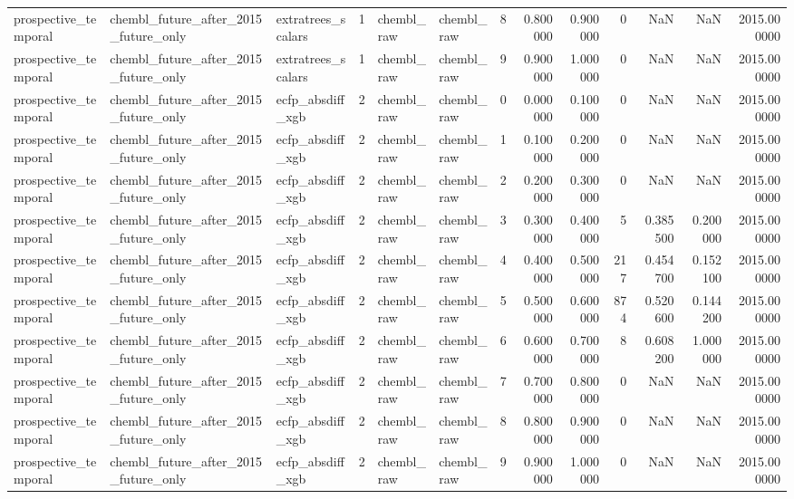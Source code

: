 \begin{longtable}{lllrllrrrrrrr}
prospective\_temporal & chembl\_future\_after\_2015\_future\_only & extratrees\_scalars & 1 & chembl\_raw & chembl\_raw & 8 & 0.800000 & 0.900000 & 0 & NaN & NaN & 2015.000000 \\
prospective\_temporal & chembl\_future\_after\_2015\_future\_only & extratrees\_scalars & 1 & chembl\_raw & chembl\_raw & 9 & 0.900000 & 1.000000 & 0 & NaN & NaN & 2015.000000 \\
prospective\_temporal & chembl\_future\_after\_2015\_future\_only & ecfp\_absdiff\_xgb & 2 & chembl\_raw & chembl\_raw & 0 & 0.000000 & 0.100000 & 0 & NaN & NaN & 2015.000000 \\
prospective\_temporal & chembl\_future\_after\_2015\_future\_only & ecfp\_absdiff\_xgb & 2 & chembl\_raw & chembl\_raw & 1 & 0.100000 & 0.200000 & 0 & NaN & NaN & 2015.000000 \\
prospective\_temporal & chembl\_future\_after\_2015\_future\_only & ecfp\_absdiff\_xgb & 2 & chembl\_raw & chembl\_raw & 2 & 0.200000 & 0.300000 & 0 & NaN & NaN & 2015.000000 \\
prospective\_temporal & chembl\_future\_after\_2015\_future\_only & ecfp\_absdiff\_xgb & 2 & chembl\_raw & chembl\_raw & 3 & 0.300000 & 0.400000 & 5 & 0.385500 & 0.200000 & 2015.000000 \\
prospective\_temporal & chembl\_future\_after\_2015\_future\_only & ecfp\_absdiff\_xgb & 2 & chembl\_raw & chembl\_raw & 4 & 0.400000 & 0.500000 & 217 & 0.454700 & 0.152100 & 2015.000000 \\
prospective\_temporal & chembl\_future\_after\_2015\_future\_only & ecfp\_absdiff\_xgb & 2 & chembl\_raw & chembl\_raw & 5 & 0.500000 & 0.600000 & 874 & 0.520600 & 0.144200 & 2015.000000 \\
prospective\_temporal & chembl\_future\_after\_2015\_future\_only & ecfp\_absdiff\_xgb & 2 & chembl\_raw & chembl\_raw & 6 & 0.600000 & 0.700000 & 8 & 0.608200 & 1.000000 & 2015.000000 \\
prospective\_temporal & chembl\_future\_after\_2015\_future\_only & ecfp\_absdiff\_xgb & 2 & chembl\_raw & chembl\_raw & 7 & 0.700000 & 0.800000 & 0 & NaN & NaN & 2015.000000 \\
prospective\_temporal & chembl\_future\_after\_2015\_future\_only & ecfp\_absdiff\_xgb & 2 & chembl\_raw & chembl\_raw & 8 & 0.800000 & 0.900000 & 0 & NaN & NaN & 2015.000000 \\
prospective\_temporal & chembl\_future\_after\_2015\_future\_only & ecfp\_absdiff\_xgb & 2 & chembl\_raw & chembl\_raw & 9 & 0.900000 & 1.000000 & 0 & NaN & NaN & 2015.000000 \\

\end{longtable}
